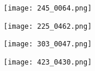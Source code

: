 \documentclass[../thesis.tex]{subfiles}
\begin{document}
\begin{figure}[H]
    \centering
    \texttt{[image: 245\_0064.png]}
    \label{245_0064}
\end{figure}

\begin{figure}[H]
    \centering
    \texttt{[image: 225\_0462.png]}
    \label{225_0462}
\end{figure}

\begin{figure}[H]
    \centering
    \texttt{[image: 303\_0047.png]} 
    \label{303_0047}
\end{figure}

\begin{figure}[H]
    \centering
    \texttt{[image: 423\_0430.png]}
    \label{423_0430}
\end{figure}
\end{document}
